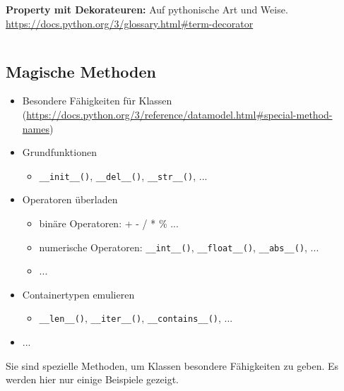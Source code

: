 \begin{minipage}[t]{0.34\textwidth}
	$\quad$ \\[35pt]
	\textbf{Property mit Dekorateuren:} Auf pythonische Art und Weise.\\
	\url{https://docs.python.org/3/glossary.html#term-decorator}
\end{minipage}
\begin{minipage}[t]{0.02\textwidth} $\quad$ \end{minipage}
\begin{minipage}[t]{0.64\textwidth}
	
\end{minipage}




\subsection{Magische Methoden}
\begin{itemize}
	\item Besondere Fähigkeiten für Klassen\\ (\url{https://docs.python.org/3/reference/datamodel.html#special-method-names})
	\item Grundfunktionen
	\begin{itemize}
		\item \texttt{\_\_init\_\_()}, \texttt{\_\_del\_\_()}, \texttt{\_\_str\_\_()}, ...
	\end{itemize}
	\item Operatoren überladen
	\begin{itemize}
		\item binäre Operatoren: + - / * \% ...
		\item numerische Operatoren: \texttt{\_\_int\_\_()}, \texttt{\_\_float\_\_()}, \texttt{\_\_abs\_\_()}, ...
		\item ...
	\end{itemize}
	\item Containertypen emulieren
	\begin{itemize}
		\item \texttt{\_\_len\_\_()}, \texttt{\_\_iter\_\_()}, \texttt{\_\_contains\_\_()}, ...
	\end{itemize}
	\item ...
\end{itemize}
Sie sind spezielle Methoden, um Klassen besondere Fähigkeiten zu geben. Es werden hier nur einige Beispiele gezeigt.


